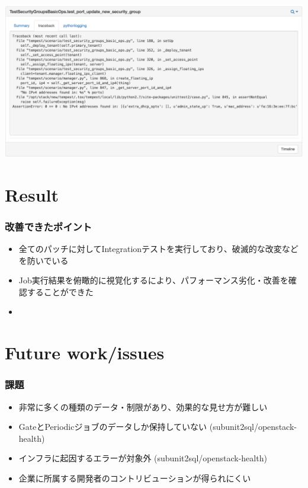 \documentclass[aspectratio=169,11pt,hyperref={colorlinks=true}]{beamer}
\begin{document}
\begin{frame}
  \begin{center}
    \includegraphics[width=1.3\textheight]{stackviz-sample-traceback.png}
  \end{center}
\end{frame}

\section{Result}
\begin{frame}
  \frametitle{改善できたポイント}
  \begin{itemize}
    \item 全てのパッチに対してIntegrationテストを実行しており、破滅的な改変などを防いでいる
    \item Job実行結果を俯瞰的に視覚化するにより、パフォーマンス劣化・改善を確認することができた
    \item
  \end{itemize}
\end{frame}

\section{Future work/issues}
\begin{frame}
  \frametitle{課題}
  \begin{itemize}
    \item 非常に多くの種類のデータ・制限があり、効果的な見せ方が難しい
    \item GateとPeriodicジョブのデータしか保持していない (subunit2sql/openstack-health)
    \item インフラに起因するエラーが対象外 (subunit2sql/openstack-health)
    \item 企業に所属する開発者のコントリビューションが得られにくい
  \end{itemize}
\end{frame}
\end{document}
